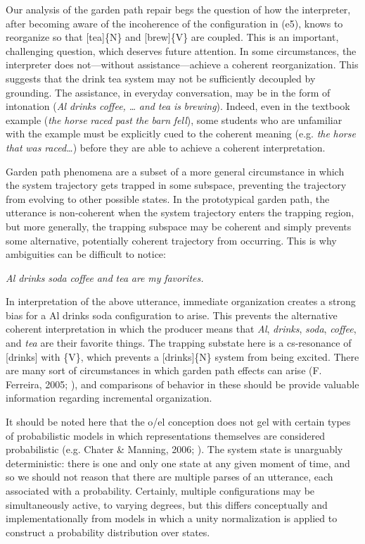   Our analysis of the garden path repair begs the question of how the interpreter, after becoming aware of the incoherence of the configuration in (e5), knows to reorganize so that [tea]\{N\} and [brew]\{V\} are coupled. This is an important, challenging question, which deserves future attention. In some circumstances, the interpreter does not—without assistance—achieve a coherent reorganization. This suggests that the {\textbar}drink tea{\textbar} system may not be sufficiently decoupled by grounding. The assistance, in everyday conversation, may be in the form of intonation (\textit{Al} \textit{drinks} \textit{coffee,} \textit{…} \textit{and} \textit{tea} \textit{is} \textit{brewing}). Indeed, even in the textbook example (\textit{the} \textit{horse} \textit{raced} \textit{past} \textit{the} \textit{barn} \textit{fell}), some students who are unfamiliar with the example must be explicitly cued to the coherent meaning (e.g. \textit{the} \textit{horse} \textit{that} \textit{was} \textit{raced…}) before they are able to achieve a coherent interpretation. 

  Garden path phenomena are a subset of a more general circumstance in which the system trajectory gets trapped in some subspace, preventing the trajectory from evolving to other possible states. In the prototypical garden path, the utterance is non-coherent when the system trajectory enters the trapping region, but more generally, the trapping subspace may be coherent and simply prevents some alternative, potentially coherent trajectory from occurring. This is why ambiguities can be difficult to notice:

    \textit{Al} \textit{drinks} \textit{soda} \textit{coffee} \textit{and} \textit{tea} \textit{are} \textit{my} \textit{favorites.}

  In interpretation of the above utterance, immediate organization creates a strong bias for a {\textbar}Al drinks soda{\textbar} configuration to arise. This prevents the alternative coherent interpretation in which the producer means that \textit{Al}, \textit{drinks}, \textit{soda}, \textit{coffee}, and \textit{tea} are their favorite things. The trapping substate here is a cs-resonance of [drinks] with \{V\}, which prevents a [drinks]\{N\} system from being excited. There are many sort of circumstances in which garden path effects can arise (F. Ferreira, 2005; \citealt{Pritchett1988}), and comparisons of behavior in these should be provide valuable information regarding incremental organization. 

  It should be noted here that the o/el conception does not gel with certain types of probabilistic models in which representations themselves are considered probabilistic (e.g. Chater \& Manning, 2006; \citealt{Manning2003}). The system state is unarguably deterministic: there is one and only one state at any given moment of time, and so we should not reason that there are multiple parses of an utterance, each associated with a probability. Certainly, multiple configurations may be simultaneously active, to varying degrees, but this differs conceptually and implementationally from models in which a unity normalization is applied to construct a probability distribution over states.

